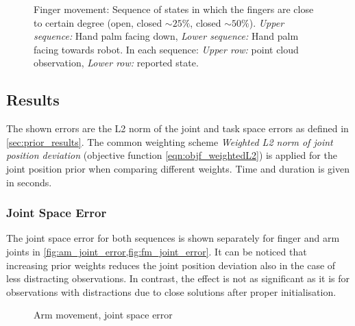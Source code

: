 \begin{figure}
\begin{tabular}{c:c:c}
\end{tabular}
\caption[Finger movement sequence]{Finger movement: Sequence of states in which the fingers are close to certain degree (open, closed $\sim 25\%$, closed $\sim 50\%$). \textit{Upper sequence:} Hand palm facing down, \textit{Lower sequence:} Hand palm facing towards robot. In each sequence: \textit{Upper row:} point cloud observation, \textit{Lower row:} reported state.}
\label{fig:finger_movement_states}
\end{figure}


\subsection{Results}

The shown errors are the L2 norm of the joint and task space errors as defined in \cref{sec:prior_results}. The common weighting scheme \emph{Weighted L2 norm of joint position deviation} (objective function \cref{eqn:objf_weightedL2}) is applied for the joint position prior when comparing different weights. Time and duration is given in seconds.

\subsubsection{Joint Space Error}

The joint space error for both sequences is shown separately for finger and arm joints in \cref{fig:am_joint_error,fig:fm_joint_error}. It can be noticed that increasing prior weights reduces the joint position deviation also in the case of less distracting observations. In contrast, the effect is not as significant as it is for observations with distractions due to close solutions after proper initialisation.

\begin{figure}
\centering
{}
\caption{Arm movement, joint space error}
\label{fig:am_joint_error}
\end{figure}

